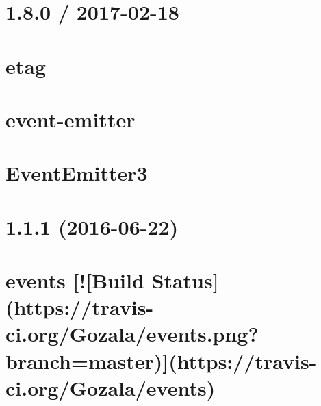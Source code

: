 \documentclass[twoside]{book}
\newcommand{\+}{\discretionary{\mbox{\scriptsize$\hookleftarrow$}}{}{}}
\begin{document}
\chapter{1.8.0 / 2017-\/02-\/18}
\label{md__c_1_workspace_demo_src_main_script_node_modules_etag__h_i_s_t_o_r_y}

\chapter{etag}
\label{md__c_1_workspace_demo_src_main_script_node_modules_etag__r_e_a_d_m_e}

\chapter{event-\/emitter}
\label{md__c_1_workspace_demo_src_main_script_node_modules_event-emitter__r_e_a_d_m_e}

\chapter{Event\+Emitter3}
\label{md__c_1_workspace_demo_src_main_script_node_modules_eventemitter3__r_e_a_d_m_e}

\chapter{1.1.1 (2016-\/06-\/22)}
\label{md__c_1_workspace_demo_src_main_script_node_modules_events__history}

\chapter{events \mbox{[}!\mbox{[}Build Status\mbox{]}(https\+://travis-\/ci.org/\+Gozala/events.png?branch=master)\mbox{]}(https\+://travis-\/ci.org/\+Gozala/events)}
\label{md__c_1_workspace_demo_src_main_script_node_modules_events__readme}

\end{document}
